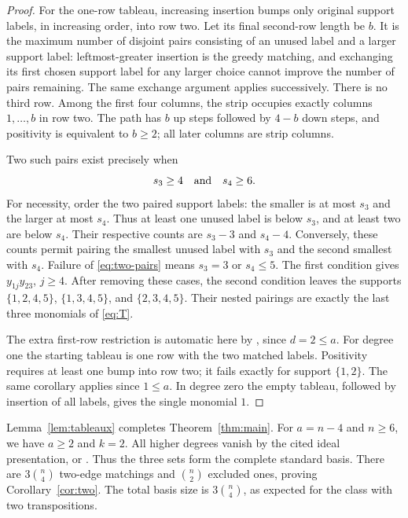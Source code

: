 \documentclass[11pt,a4paper]{article}
\begin{document}
\begin{proof}
For the one-row tableau, increasing insertion bumps only original support
labels, in increasing order, into row two. Let its final second-row length
be $b$. It is the maximum number of disjoint pairs consisting of an unused
label and a larger support label: leftmost-greater insertion is the greedy
matching, and exchanging its first chosen support label for any larger
choice cannot improve the number of pairs remaining. The same exchange
argument applies successively. There is no third row. Among the first
four columns, the strip occupies exactly columns $1,\ldots,b$ in row two.
The path has $b$ up steps followed by $4-b$ down steps, and positivity is
equivalent to $b\geq2$; all later columns are strip columns.

Two such pairs exist precisely when
\begin{equation}\label{eq:two-pairs}
 s_3\geq4\quad\hbox{and}\quad s_4\geq6.
\end{equation}
For necessity, order the two paired support labels: the smaller is at
most $s_3$ and the larger at most $s_4$. Thus at least one unused label
is below $s_3$, and at least two are below $s_4$. Their respective counts
are $s_3-3$ and $s_4-4$. Conversely, these counts permit pairing the
smallest unused label with $s_3$ and the second smallest with $s_4$.
Failure of \eqref{eq:two-pairs} means $s_3=3$ or $s_4\leq5$.
The first condition gives $y_{1j}y_{23}$, $j\geq4$.
After removing these cases, the second condition leaves the supports
$\{1,2,4,5\}$, $\{1,3,4,5\}$, and $\{2,3,4,5\}$.
Their nested pairings are exactly the last three monomials of
\eqref{eq:T}.

The extra first-row restriction is automatic here by
\cite[Corollary 24]{ZhuPositive}, since $d=2\leq a$.
For degree one the starting tableau is one row with the two matched
labels. Positivity requires at least one bump into row two; it fails
exactly for support $\{1,2\}$. The same corollary applies since $1\leq a$.
In degree zero the empty tableau, followed by insertion of all labels,
gives the single monomial $1$.
\end{proof}

Lemma~\ref{lem:tableaux} completes Theorem~\ref{thm:main}.
For $a=n-4$ and $n\geq6$, we have $a\geq2$ and $k=2$.
All higher degrees vanish by the cited ideal presentation, or
\cite[Lemma A.3]{ZhuRook}. Thus the three sets form the complete standard
basis. There are $3\binom n4$ two-edge matchings and $\binom n2$
excluded ones, proving Corollary~\ref{cor:two}. The total basis size is
$3\binom n4$, as expected for the class with two transpositions.
\end{document}
